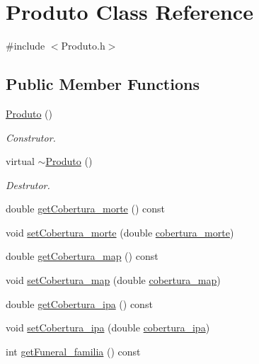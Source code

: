 \hypertarget{class_produto}{}\section{Produto Class Reference}
\label{class_produto}


{\ttfamily \#include $<$Produto.\+h$>$}

\subsection*{Public Member Functions}
\begin{DoxyCompactItemize}
\item 
\hyperlink{class_produto_adcd5834a1f04cc42fef88bf60217b8f4}{Produto} ()
\begin{DoxyCompactList}\small\item\em Construtor. \end{DoxyCompactList}\item 
virtual \hyperlink{class_produto_a84a8b28176b743e8c74bfd89aee9a9b2}{$\sim$\+Produto} ()
\begin{DoxyCompactList}\small\item\em Destrutor. \end{DoxyCompactList}\item 
double \hyperlink{class_produto_a66eb39c5d64248b77430d6cf27cc902b}{get\+Cobertura\+\_\+morte} () const
\item 
void \hyperlink{class_produto_a8422c0f72c56a4ce90af73ebf4f5c203}{set\+Cobertura\+\_\+morte} (double \hyperlink{class_produto_a37d0ef7fbcdce4de9c27911f85f7c0f1}{cobertura\+\_\+morte})
\item 
double \hyperlink{class_produto_a03ac2fedfec386c281e7eb5c9140949a}{get\+Cobertura\+\_\+map} () const
\item 
void \hyperlink{class_produto_ae59bdeebd4cdf976b7e4fba925279d89}{set\+Cobertura\+\_\+map} (double \hyperlink{class_produto_ad9abc041cef9daa2abda343285df5a2e}{cobertura\+\_\+map})
\item 
double \hyperlink{class_produto_a7fb03a7eb1d2a682ee87909217c3fb10}{get\+Cobertura\+\_\+ipa} () const
\item 
void \hyperlink{class_produto_aa73736a3bd3b4eb3c44be23d22ba7b28}{set\+Cobertura\+\_\+ipa} (double \hyperlink{class_produto_afb515e4bf63df7562d4c78e31ee79426}{cobertura\+\_\+ipa})
\item 
int \hyperlink{class_produto_a9ef9eda75c2e2787630f390767b4bff1}{get\+Funeral\+\_\+familia} () const
\item 

\end{DoxyCompactItemize}
